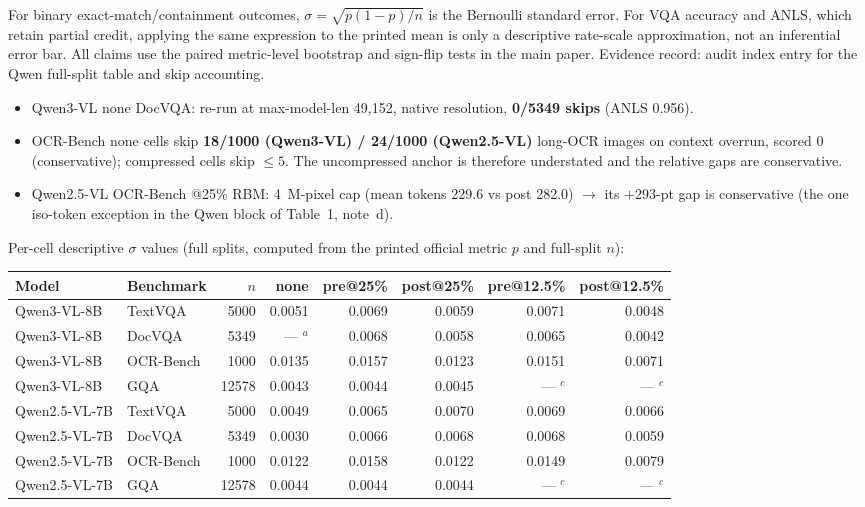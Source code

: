 \documentclass[journal]{IEEEtran}
\begin{document}
For binary exact-match/containment outcomes,
$\sigma=\sqrt{p(1-p)/n}$ is the Bernoulli standard error. For VQA accuracy and
ANLS, which retain partial credit, applying the same expression to the printed
mean is only a descriptive rate-scale approximation, not an inferential error
bar. All claims use the paired metric-level bootstrap and sign-flip tests in
the main paper. Evidence record: audit index entry for the Qwen full-split
table and skip accounting.

\begin{itemize}
  \item Qwen3-VL none DocVQA: re-run at max-model-len 49,152, native
    resolution, \textbf{0/5349 skips} (ANLS 0.956).
  \item OCR-Bench none cells skip \textbf{18/1000 (Qwen3-VL) / 24/1000
    (Qwen2.5-VL)} long-OCR images on context overrun, scored 0 (conservative);
    compressed cells skip $\leq 5$. The uncompressed anchor is therefore
    understated and the relative gaps are conservative.
  \item Qwen2.5-VL OCR-Bench @25\% RBM: 4~M-pixel cap (mean tokens 229.6 vs
    post 282.0) $\to$ its $+293$-pt gap is conservative (the one iso-token
    exception in the Qwen block of Table~1, note~d).
\end{itemize}

\noindent Per-cell descriptive $\sigma$ values (full splits, computed from the
printed official metric $p$ and full-split $n$):

\begin{table}[ht]
  \centering
  \small
  \begin{tabular}{@{}l l r r r r r r@{}}
    \toprule
    Model & Benchmark & $n$ & none & pre@25\% & post@25\% & pre@12.5\% & post@12.5\% \\
    \midrule
    Qwen3-VL-8B   & TextVQA   & 5000  & 0.0051   & 0.0069 & 0.0059 & 0.0071 & 0.0048 \\
    Qwen3-VL-8B   & DocVQA    & 5349  & --- $^{a}$ & 0.0068 & 0.0058 & 0.0065 & 0.0042 \\
    Qwen3-VL-8B   & OCR-Bench & 1000  & 0.0135   & 0.0157 & 0.0123 & 0.0151 & 0.0071 \\
    Qwen3-VL-8B   & GQA       & 12578 & 0.0043   & 0.0044 & 0.0045 & --- $^{c}$ & --- $^{c}$ \\
    \midrule
    Qwen2.5-VL-7B & TextVQA   & 5000  & 0.0049   & 0.0065 & 0.0070 & 0.0069 & 0.0066 \\
    Qwen2.5-VL-7B & DocVQA    & 5349  & 0.0030   & 0.0066 & 0.0068 & 0.0068 & 0.0059 \\
    Qwen2.5-VL-7B & OCR-Bench & 1000  & 0.0122   & 0.0158 & 0.0122 & 0.0149 & 0.0079 \\
    Qwen2.5-VL-7B & GQA       & 12578 & 0.0044   & 0.0044 & 0.0044 & --- $^{c}$ & --- $^{c}$ \\
    \bottomrule
  \end{tabular}
\end{table}
\end{document}
